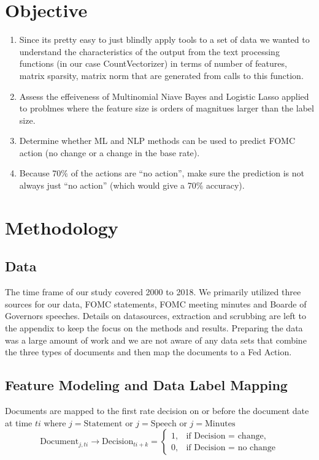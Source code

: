 \documentclass[11pt]{article}
\begin{document}
{\section{Objective}
\begin{enumerate}
\item Since its pretty easy to just blindly apply tools to a set of data we wanted to understand the 
characteristics of the output from the text processing functions (in our case CountVectorizer) in terms of number of features, matrix sparsity, matrix norm
that are generated from calls to this function.
\item Assess the effeiveness of Multinomial Niave Bayes and Logistic Lasso applied to problmes where the feature size is orders of magnitues larger than the label size.
\item Determine whether ML and NLP methods can be used to predict FOMC action (no change or a change in the base rate).
\item Because 70$\%$ of the actions are ``no action'', make sure the prediction is not always just ``no action'' (which would give a 70$\%$ accuracy).
\end{enumerate}

\section{Methodology}

\subsection{Data}

The time frame of our study covered 2000 to 2018. 
We primarily utilized three sources for our data, FOMC statements, FOMC meeting minutes and Boarde of Governors speeches.
Details on datasources, extraction and scrubbing are left to the appendix to keep the focus on the methods and results.
Preparing the data was a large amount of work and we are not aware of any data sets that combine the three types of documents
and then map the documents to a Fed Action.

\subsection{Feature Modeling and Data Label Mapping}
\noindent Documents are mapped to the first rate decision on or before the document date at time $ti$
where $j=\text{Statement}$ or $j=\text{Speech}$ or $j=\text{Minutes}$
\begin{equation*}
\mbox{Document}_{j,ti} \rightarrow \mbox{Decision}_{ti+k}
 = \begin{cases}
  1, & \text{if  Decision = change}, \\
  0, & \text{if  Decision = no change}
\end{cases}
\end{equation*}

}
\end{document}
